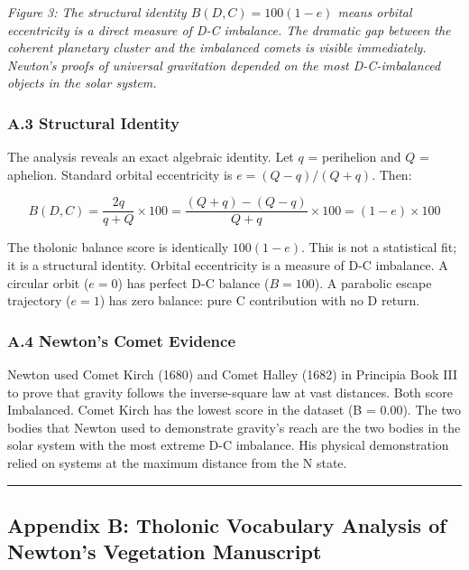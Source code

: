 \documentclass[12pt]{article}
\begin{document}
\emph{Figure 3: The structural identity \(B(D,C) = 100(1-e)\) means
orbital eccentricity is a direct measure of D-C imbalance. The dramatic
gap between the coherent planetary cluster and the imbalanced comets is
visible immediately. Newton's proofs of universal gravitation depended
on the most D-C-imbalanced objects in the solar system.}

\subsubsection{A.3 Structural Identity}\label{a.3-structural-identity}

The analysis reveals an exact algebraic identity. Let \(q\) = perihelion
and \(Q\) = aphelion. Standard orbital eccentricity is
\(e = (Q-q)/(Q+q)\). Then:

\[B(D,C) = \frac{2q}{q+Q} \times 100 = \frac{(Q+q)-(Q-q)}{Q+q} \times 100 = (1-e) \times 100\]

The tholonic balance score is identically \(100(1-e)\). This is not a
statistical fit; it is a structural identity. Orbital eccentricity is a
measure of D-C imbalance. A circular orbit (\(e = 0\)) has perfect D-C
balance (\(B = 100\)). A parabolic escape trajectory (\(e = 1\)) has
zero balance: pure C contribution with no D return.

\subsubsection{A.4 Newton's Comet
Evidence}\label{a.4-newtons-comet-evidence}

Newton used Comet Kirch (1680) and Comet Halley (1682) in Principia Book
III to prove that gravity follows the inverse-square law at vast
distances. Both score Imbalanced. Comet Kirch has the lowest score in
the dataset (B = 0.00). The two bodies that Newton used to demonstrate
gravity's reach are the two bodies in the solar system with the most
extreme D-C imbalance. His physical demonstration relied on systems at
the maximum distance from the N state.

\begin{center}\rule{0.5\linewidth}{0.5pt}\end{center}

\subsection{Appendix B: Tholonic Vocabulary Analysis of Newton's
Vegetation
Manuscript}\label{appendix-b-tholonic-vocabulary-analysis-of-newtons-vegetation-manuscript}
\end{document}
